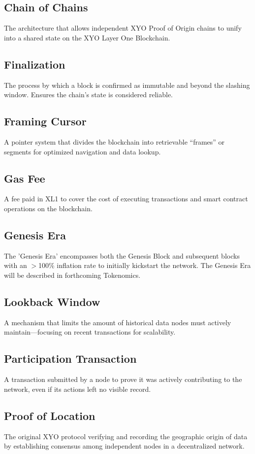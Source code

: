 \documentclass{article}
\begin{document}
\subsection*{Chain of Chains}
The architecture that allows independent XYO Proof of Origin chains to unify
into a shared state on the XYO Layer One Blockchain.

\subsection*{Finalization}
The process by which a block is confirmed as immutable and beyond the slashing
window. Ensures the chain's state is considered reliable.

\subsection*{Framing Cursor}
A pointer system that divides the blockchain into retrievable “frames” or
segments for optimized navigation and data lookup.

\subsection*{Gas Fee}
A fee paid in XL1 to cover the cost of executing transactions and smart
contract operations on the blockchain.

\subsection*{Genesis Era}
The 'Genesis Era' encompasses both the Genesis Block and subsequent blocks with
an $>$100\% inflation rate to initially kickstart the network. The Genesis Era
will be described in forthcoming Tokenomics.

\subsection*{Lookback Window}
A mechanism that limits the amount of historical data nodes must actively
maintain—focusing on recent transactions for scalability.

\subsection*{Participation Transaction}
A transaction submitted by a node to prove it was actively contributing to the
network, even if its actions left no visible record.

\subsection*{Proof of Location}
The original XYO protocol verifying and recording the geographic origin of data
by establishing consensus among independent nodes in a decentralized network.
\end{document}
